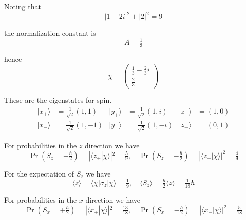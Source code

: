 


Noting that
\begin{equation*}
|1-2i|^2+|2|^2=9
\end{equation*}

the normalization constant is
\begin{equation*}
A=\tfrac{1}{3}
\end{equation*}

hence
\begin{equation*}
\chi=\begin{pmatrix}\frac{1}{3}-\frac{2}{3}i\\[1ex]\frac{2}{3}\end{pmatrix}
\end{equation*}

These are the eigenstates for spin.
\begin{align*}
|x_+\rangle&=\tfrac{1}{\sqrt2}(1,1) &
|y_+\rangle&=\tfrac{1}{\sqrt2}(1,i) &
|z_+\rangle&=(1,0)
\\
|x_-\rangle&=\tfrac{1}{\sqrt2}(1,-1) &
|y_-\rangle&=\tfrac{1}{\sqrt2}(1,-i) &
|z_-\rangle&=(0,1)
\end{align*}

For probabilities in the $z$ direction we have
\begin{equation*}
\Pr\left(S_z=+\tfrac{\hbar}{2}\right)=|\langle z_+|\chi\rangle|^2=\tfrac{5}{9},\quad
\Pr\left(S_z=-\tfrac{\hbar}{2}\right)=|\langle z_-|\chi\rangle|^2=\tfrac{4}{9}
\end{equation*}

For the expectation of $S_z$ we have
\begin{equation*}
\langle z\rangle=\langle\chi|\sigma_z|\chi\rangle=\tfrac{1}{9},\quad
\langle S_z\rangle=\tfrac{\hbar}{2}\langle z\rangle=\tfrac{1}{18}\hbar
\end{equation*}

For probabilities in the $x$ direction we have
\begin{equation*}
\Pr\left(S_x=+\tfrac{\hbar}{2}\right)=|\langle x_+|\chi\rangle|^2=\tfrac{13}{18},\quad
\Pr\left(S_x=-\tfrac{\hbar}{2}\right)=|\langle x_-|\chi\rangle|^2=\tfrac{5}{18}
\end{equation*}

